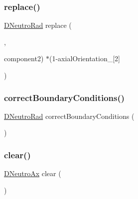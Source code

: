\mbox{\label{setNeutronicsVariables_8H_a72c5bb2aaa0a46f9f16e5d5481e39caa}} 
\subsubsection{\texorpdfstring{replace()}{replace()}\hspace{0.1cm}{\footnotesize\ttfamily [3/3]}}
{\footnotesize\ttfamily \hyperlink{setNeutronicsVariablesLowMem_8H_a87a8e73540cc64ca6321cea333ded9ac}{D\+Neutro\+Rad} replace (\begin{DoxyParamCaption}\item[{2}]{,  }\item[{D\+Neutro\+Rad.}]{component2) $\ast$(1-\/axial\+Orientation\+\_\+\mbox{[}2\mbox{]} }\end{DoxyParamCaption})}

\mbox{\label{setNeutronicsVariables_8H_a376b322b6046a21fa234a3bcb766c325}} 
\subsubsection{\texorpdfstring{correct\+Boundary\+Conditions()}{correctBoundaryConditions()}}
{\footnotesize\ttfamily \hyperlink{setNeutronicsVariablesLowMem_8H_a87a8e73540cc64ca6321cea333ded9ac}{D\+Neutro\+Rad} correct\+Boundary\+Conditions (\begin{DoxyParamCaption}{ }\end{DoxyParamCaption})}

\mbox{\label{setNeutronicsVariables_8H_af06fa450a9d25b0d1f306ef2f6d6945d}} 
\subsubsection{\texorpdfstring{clear()}{clear()}}
{\footnotesize\ttfamily \hyperlink{setNeutronicsVariablesLowMem_8H_acbede4ae4993afe497317c8781340cb6}{D\+Neutro\+Ax} clear (\begin{DoxyParamCaption}{ }\end{DoxyParamCaption})}



